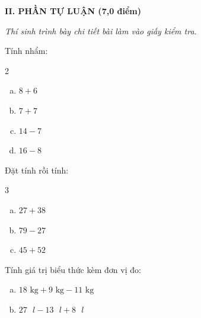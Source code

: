 \vspace{4mm}
\textbf{\large II. PHẦN TỰ LUẬN (7,0 điểm)}

{\itshape Thí sinh trình bày chi tiết bài làm vào giấy kiểm tra.}

\begin{bt}[1,0 điểm]
Tính nhẩm:
\begin{multicols}{2}
\begin{enumerate}[a)]
  \item $8 + 6$
  \item $7 + 7$
  \item $14 - 7$
  \item $16 - 8$
\end{enumerate}
\end{multicols}
\end{bt}

\begin{bt}[1,5 điểm]
Đặt tính rồi tính:
\begin{multicols}{3}
\begin{enumerate}[a)]
  \item $27 + 38$
  \item $79 - 27$
  \item $45 + 52$
\end{enumerate}
\end{multicols}
\end{bt}

\begin{bt}[1,0 điểm]
Tính giá trị biểu thức kèm đơn vị đo:
\begin{enumerate}[a)]
  \item $18\text{ kg} + 9\text{ kg} - 11\text{ kg}$
  \item $27\text{ }l - 13\text{ }l + 8\text{ }l$
\end{enumerate}
\end{bt}


